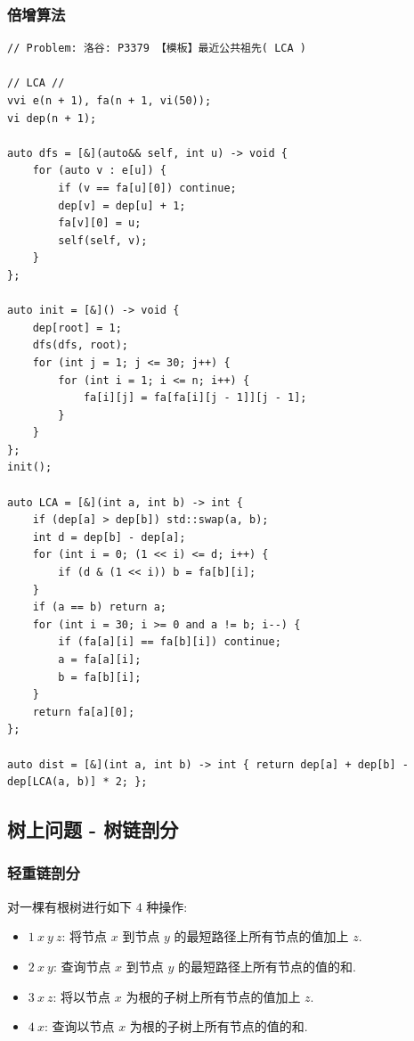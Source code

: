 \documentclass[UTF8, a4paper, titlepage, twoside]{ctexart}
\begin{document}
\subsubsection{ 倍增算法 }
\begin{lstlisting}[style=cpp]
// Problem: 洛谷: P3379 【模板】最近公共祖先( LCA )

// LCA //
vvi e(n + 1), fa(n + 1, vi(50));
vi dep(n + 1);

auto dfs = [&](auto&& self, int u) -> void {
    for (auto v : e[u]) {
        if (v == fa[u][0]) continue;
        dep[v] = dep[u] + 1;
        fa[v][0] = u;
        self(self, v);
    }
};

auto init = [&]() -> void {
    dep[root] = 1;
    dfs(dfs, root);
    for (int j = 1; j <= 30; j++) {
        for (int i = 1; i <= n; i++) {
            fa[i][j] = fa[fa[i][j - 1]][j - 1];
        }
    }
};
init();

auto LCA = [&](int a, int b) -> int {
    if (dep[a] > dep[b]) std::swap(a, b);
    int d = dep[b] - dep[a];
    for (int i = 0; (1 << i) <= d; i++) {
        if (d & (1 << i)) b = fa[b][i];
    }
    if (a == b) return a;
    for (int i = 30; i >= 0 and a != b; i--) {
        if (fa[a][i] == fa[b][i]) continue;
        a = fa[a][i];
        b = fa[b][i];
    }
    return fa[a][0];
};

auto dist = [&](int a, int b) -> int { return dep[a] + dep[b] - dep[LCA(a, b)] * 2; };
\end{lstlisting}

\subsection{ 树上问题 - 树链剖分 }
\subsubsection{ 轻重链剖分 }
对一棵有根树进行如下 $4$ 种操作: 
\begin{itemize}
	\item $1 \ x \ y \ z$: 将节点 $x$ 到节点 $y$ 的最短路径上所有节点的值加上 $z$. 
	\item $2 \ x \ y$: 查询节点 $x$ 到节点 $y$ 的最短路径上所有节点的值的和. 
	\item $3 \ x \ z$: 将以节点 $x$ 为根的子树上所有节点的值加上 $z$. 
	\item $4 \ x$: 查询以节点 $x$ 为根的子树上所有节点的值的和. 
\end{itemize}
\end{document}
